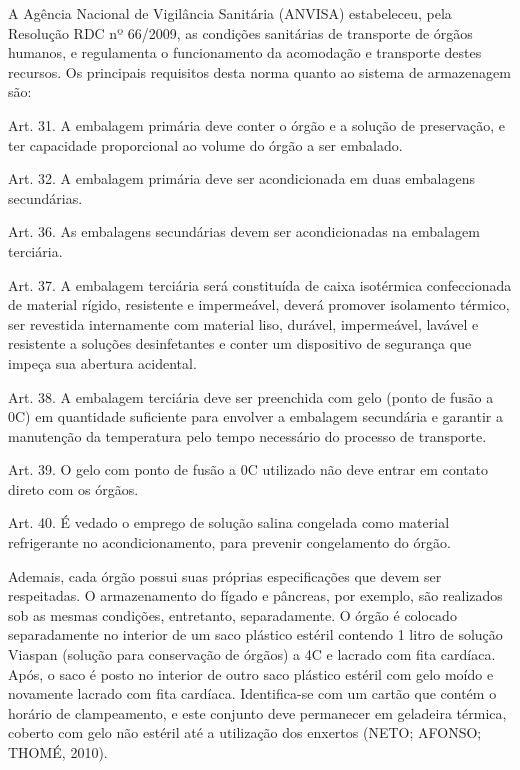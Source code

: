 A Agência Nacional de Vigilância Sanitária (ANVISA) estabeleceu, pela Resolução RDC nº 66/2009, as condições sanitárias de transporte de órgãos humanos, e regulamenta o funcionamento da acomodação e  transporte destes recursos. Os principais requisitos desta norma quanto ao sistema de armazenagem são:

\begin{citacao}


Art. 31. A embalagem primária deve conter o órgão e a solução de preservação, e ter capacidade proporcional ao volume do órgão a ser embalado.

 Art. 32. A embalagem primária deve ser acondicionada em duas embalagens secundárias.
 
Art. 36. As embalagens secundárias devem ser acondicionadas na embalagem terciária.

 Art. 37. A embalagem terciária será constituída de caixa isotérmica confeccionada de material rígido, resistente e impermeável, deverá promover isolamento térmico, ser revestida internamente com material liso, durável, impermeável, lavável e resistente a soluções desinfetantes e conter um dispositivo de segurança que impeça sua abertura acidental. 
 
Art. 38. A embalagem terciária deve ser preenchida com gelo (ponto de fusão a 0\degree C) em quantidade suficiente para envolver a embalagem secundária e garantir a manutenção da temperatura pelo tempo necessário do processo de transporte. 

Art. 39. O gelo com ponto de fusão a 0\degree C utilizado não deve entrar em contato direto com os órgãos. 

Art. 40. É vedado o emprego de solução salina congelada como material refrigerante no acondicionamento, para prevenir congelamento do órgão.  

\end{citacao}

Ademais, cada órgão possui suas próprias especificações que devem ser respeitadas. O armazenamento do fígado e pâncreas, por exemplo, são realizados sob as mesmas condições, entretanto, separadamente. O órgão é colocado separadamente no interior de um saco plástico estéril contendo 1 litro de solução Viaspan (solução para conservação de órgãos) a 4\degree C e lacrado com fita cardíaca. Após, o saco é posto no interior de outro saco plástico estéril com gelo moído e novamente lacrado com fita cardíaca. Identifica-se com um cartão que contém o horário de clampeamento, e este conjunto deve permanecer em geladeira térmica, coberto com gelo não estéril até a utilização dos enxertos (NETO; AFONSO; THOMÉ, 2010).

